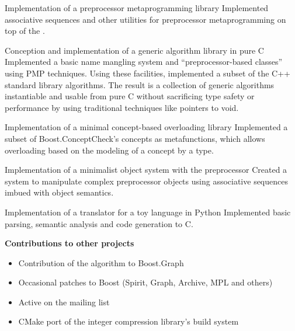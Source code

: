 \documentclass[10pt]{moderncv}
\newcommand{\myhref}[3][blue]{\href{#2}{\color{#1}{#3}}}
\begin{document}
{Implementation of a preprocessor metaprogramming library}{
    Implemented associative sequences and other utilities for preprocessor
    metaprogramming on top of the
    \myhref{http://sourceforge.net/projects/chaos-pp}{Chaos preprocessor library}.}

{Conception and implementation of a generic algorithm library in pure C}{
    Implemented a basic name mangling system and ``preprocessor-based classes''
    using PMP techniques. Using these facilities, implemented a subset of the
    C++ standard library algorithms. The result is a collection of generic
    algorithms instantiable and usable from pure C without sacrificing type
    safety or performance by using traditional techniques like pointers to void.}

{Implementation of a minimal concept-based overloading library}{
    Implemented a subset of Boost.ConceptCheck's concepts as metafunctions,
    which allows overloading based on the modeling of a concept by a type.}

{Implementation of a minimalist object system with the preprocessor}{
    Created a system to manipulate complex preprocessor objects using
    associative sequences imbued with object semantics.}

{Implementation of a translator for a toy language in Python}{
    Implemented basic parsing, semantic analysis and code generation to C.}

\cvline{}
{\textbf{Contributions to other projects}
\begin{itemize}
    \item Contribution of the \myhref{http://www.boost.org/doc/libs/1_55_0/libs/graph/doc/hawick_circuits.html}{hawick\_circuits} algorithm to Boost.Graph
    \item Occasional patches to Boost (Spirit, Graph, Archive, MPL and others)
    \item Active on the \myhref{http://news.gmane.org/gmane.comp.lib.boost.devel}{Boost.Dev} mailing list
    \item CMake port of the \myhref{http://github.com/lemire/FastPFor}{FastPFor}
          integer compression library's build system
\end{itemize}}
\end{document}
